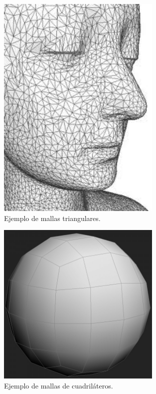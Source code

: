 \begin{minipage}{0.45\textwidth}
\begin{flushleft} \large
\begin{figure}[H]
  \centering
    \includegraphics[width=0.7\textwidth]{./Cap2_videomapping/EjemploMallaTriangular}
  \caption{Ejemplo de mallas triangulares.}
  \label{fig:mallas}
\end{figure}
\end{flushleft}
\end{minipage}
\begin{minipage}{0.45\textwidth}
\begin{flushright} \large
\begin{figure}[H]
  \centering
    \includegraphics[width=0.7\textwidth]{./Cap2_videomapping/EjemploMalla4Vertices}
  \caption{Ejemplo de mallas de cuadriláteros.}
  \label{fig:mallas}
\end{figure}

\end{flushright}
\end{minipage}

